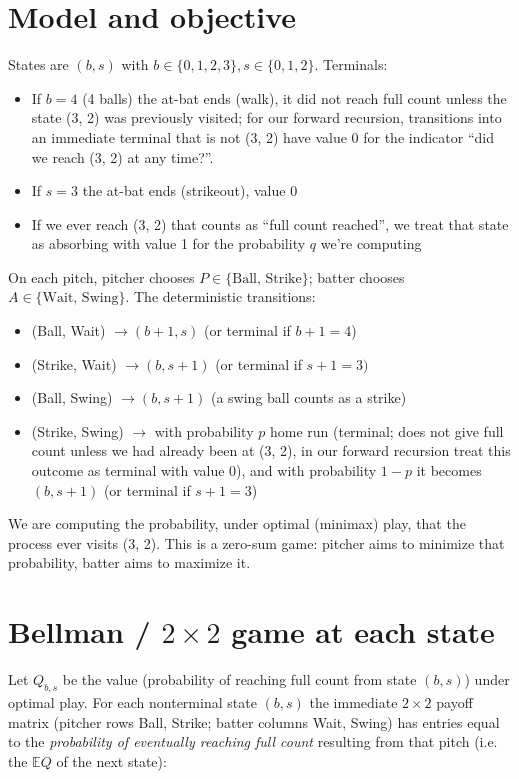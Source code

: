 \documentclass[10pt]{article}
\begin{document}
\newpage

\section{Model and objective}

States are $(b, s)$ with $b \in \{0, 1, 2, 3\}, s \in \{0, 1, 2\}$. Terminals: 
\begin{itemize}
    \item If $b = 4 $ (4 balls) the at-bat ends (walk), it did not reach full count unless the state (3, 2) was previously visited; for our forward recursion, transitions into an immediate terminal that is not (3, 2) have value 0 for the indicator ``did we reach (3, 2) at any time?''.
    \item If $s = 3 $ the at-bat ends (strikeout), value 0
    \item If we ever reach (3, 2) that counts as ``full count reached'', we treat that state as absorbing with value 1 for the probability $q $ we're computing
\end{itemize}
On each pitch, pitcher chooses $P \in \{\text{Ball, Strike}\}$; batter chooses $A \in \{\text{Wait, Swing}\}$. The deterministic transitions:
\begin{itemize}
    \item (Ball, Wait) $\to (b + 1, s)$ (or terminal if $b + 1 = 4 $)
    \item (Strike, Wait) $\to (b, s + 1)$ (or terminal if $s + 1 = 3)$
    \item (Ball, Swing) $\to (b, s + 1)$ (a swing ball counts as a strike)
    \item (Strike, Swing) $\to $ with probability $p $ home run (terminal; does not give full count unless we had already been at (3, 2), in our forward recursion treat this outcome as terminal with value 0), and with probability $1 - p $ it becomes $(b, s + 1)$ (or terminal if $s + 1 = 3 $)
\end{itemize}
We are computing the probability, under optimal (minimax) play, that the process ever visits (3, 2). This is a zero-sum game: pitcher aims to minimize that probability, batter aims to maximize it. 

\section{Bellman / $2\times 2$ game at each state}

Let $Q_{b, s}$ be the value (probability of reaching full count from state $(b, s)$) under optimal play. For each nonterminal state $(b, s)$ the immediate $2 \times 2 $ payoff matrix (pitcher rows Ball, Strike; batter columns Wait, Swing) has entries equal to the \textit{probability of eventually reaching full count} resulting from that pitch (i.e. the $\mathbb{E}Q $ of the next state):
\end{document}
